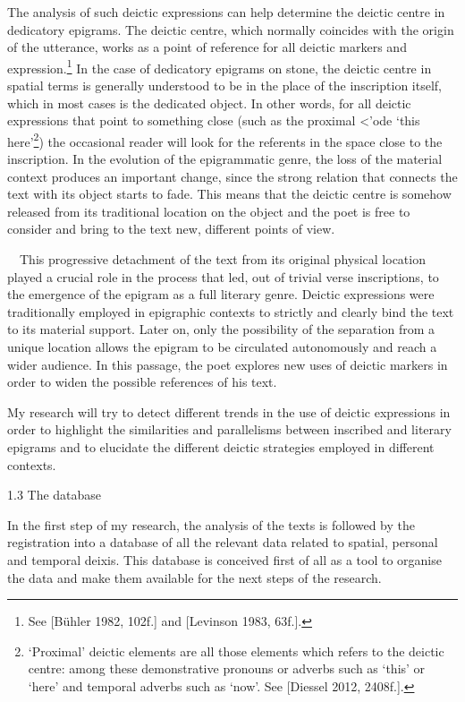 \documentclass[amsthm,ebook]{saparticle}
\begin{document}
The analysis of such deictic expressions can help determine the deictic centre in dedicatory epigrams. The deictic
centre, which normally coincides with the origin of the utterance, works as a point of reference for all deictic
markers and expression.\footnote{ See [Bühler 1982, 102f.] and [Levinson 1983, 63f.].} In the case of dedicatory
epigrams on stone, the deictic centre in spatial terms is generally understood to be in the place of the inscription
itself, which in most cases is the dedicated object. In other words, for all deictic expressions that point to
something close (such as the proximal \textgreek{<'ode ‘}this here’\footnote{ ‘Proximal’ deictic elements are all those
elements which refers to the deictic centre: among these demonstrative pronouns or adverbs such as ‘this’ or ‘here’ and
temporal adverbs such as ‘now’. See [Diessel 2012, 2408f.].}) the occasional reader will look for the referents in the
space close to the inscription. In the evolution of the epigrammatic genre, the loss of the material context produces
an important change, since the strong relation that connects the text with its object starts to fade. This means that
the deictic centre is somehow released from its traditional location on the object and the poet is free to consider and
bring to the text new, different points of view. 

\ \ This progressive detachment of the text from its original physical location played a crucial role in the process
that led, out of trivial verse inscriptions, to the emergence of the epigram as a full literary genre. Deictic
expressions were traditionally employed in epigraphic contexts to strictly and clearly bind the text to its material
support. Later on, only the possibility of the separation from a unique location allows the epigram to be circulated
autonomously and reach a wider audience. In this passage, the poet explores new uses of deictic markers in order to
widen the possible references of his text. 

My research will try to detect different trends in the use of deictic expressions in order to highlight the similarities
and parallelisms between inscribed and literary epigrams and to elucidate the different deictic strategies employed in
different contexts.

1.3 The database

In the first step of my research, the analysis of the texts is followed by the registration into a database of all the
relevant data related to spatial, personal and temporal deixis. This database is conceived first of all as a tool to
organise the data and make them available for the next steps of the research.
\end{document}
